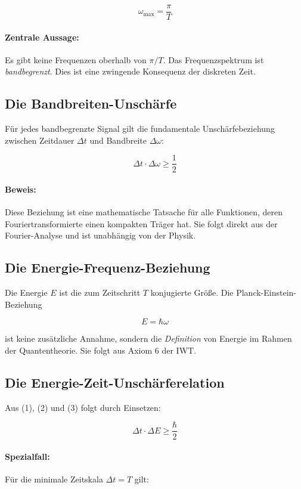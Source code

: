 \[
\omega_{\max} = \frac{\pi}{T}
\]

\paragraph{Zentrale Aussage:} Es gibt keine Frequenzen oberhalb von $\pi/T$. Das Frequenzspektrum ist \emph{bandbegrenzt}. Dies ist eine zwingende Konsequenz der diskreten Zeit.

\subsection{Die Bandbreiten-Unschärfe}

Für jedes bandbegrenzte Signal gilt die fundamentale Unschärfebeziehung zwischen Zeitdauer $\Delta t$ und Bandbreite $\Delta \omega$:

\[
\Delta t \cdot \Delta \omega \ge \frac{1}{2}
\]

\paragraph{Beweis:} Diese Beziehung ist eine mathematische Tatsache für alle Funktionen, deren Fouriertransformierte einen kompakten Träger hat. Sie folgt direkt aus der Fourier-Analyse und ist unabhängig von der Physik.

\subsection{Die Energie-Frequenz-Beziehung}

Die Energie $E$ ist die zum Zeitschritt $T$ konjugierte Größe. Die Planck-Einstein-Beziehung

\[
E = \hbar \omega
\]

ist keine zusätzliche Annahme, sondern die \emph{Definition} von Energie im Rahmen der Quantentheorie. Sie folgt aus Axiom 6 der IWT.

\subsection{Die Energie-Zeit-Unschärferelation}

Aus (1), (2) und (3) folgt durch Einsetzen:

\[
\Delta t \cdot \Delta E \ge \frac{\hbar}{2}
\]

\paragraph{Spezialfall:} Für die minimale Zeitskala $\Delta t = T$ gilt:

